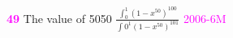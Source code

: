 \documentclass[journal,12pt,twocolumn]{IEEEtran}
\theoremstyle{remark}
\begin{document}
																																		      \textbf{\textcolor{magenta}{49}}
																																		        The value of 5050 $\frac{\int_{0}^{1}(1-x^50)^100}{\int{0}^{1} {(1-x^50)^101}}$
																																			  \hfill{\textcolor{magenta}{2006-6M}}

																																			     
																																			        
																																				  





																																				    
\end{document}
